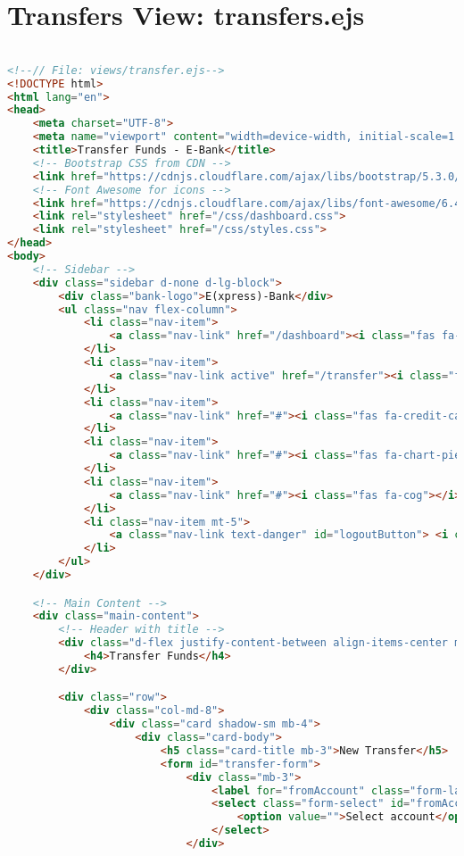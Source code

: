 \section{Transfers View: transfers.ejs}
\begin{lstlisting}[language=HTML]

<!--// File: views/transfer.ejs-->
<!DOCTYPE html>
<html lang="en">
<head>
    <meta charset="UTF-8">
    <meta name="viewport" content="width=device-width, initial-scale=1.0">
    <title>Transfer Funds - E-Bank</title>
    <!-- Bootstrap CSS from CDN -->
    <link href="https://cdnjs.cloudflare.com/ajax/libs/bootstrap/5.3.0/css/bootstrap.min.css" rel="stylesheet">
    <!-- Font Awesome for icons -->
    <link href="https://cdnjs.cloudflare.com/ajax/libs/font-awesome/6.4.0/css/all.min.css" rel="stylesheet">
    <link rel="stylesheet" href="/css/dashboard.css">
    <link rel="stylesheet" href="/css/styles.css">
</head>
<body>
    <!-- Sidebar -->
    <div class="sidebar d-none d-lg-block">
        <div class="bank-logo">E(xpress)-Bank</div>
        <ul class="nav flex-column">
            <li class="nav-item">
                <a class="nav-link" href="/dashboard"><i class="fas fa-home"></i> Dashboard</a>
            </li>
            <li class="nav-item">
                <a class="nav-link active" href="/transfer"><i class="fas fa-exchange-alt"></i> Transfers</a>
            </li>
            <li class="nav-item">
                <a class="nav-link" href="#"><i class="fas fa-credit-card"></i> Cards</a>
            </li>
            <li class="nav-item">
                <a class="nav-link" href="#"><i class="fas fa-chart-pie"></i> Investments</a>
            </li>
            <li class="nav-item">
                <a class="nav-link" href="#"><i class="fas fa-cog"></i> Settings</a>
            </li>
            <li class="nav-item mt-5">
                <a class="nav-link text-danger" id="logoutButton"> <i class="fas fa-sign-out-alt"></i> Logout</a>
            </li>
        </ul>
    </div>

    <!-- Main Content -->
    <div class="main-content">
        <!-- Header with title -->
        <div class="d-flex justify-content-between align-items-center mb-4">
            <h4>Transfer Funds</h4>
        </div>

        <div class="row">
            <div class="col-md-8">
                <div class="card shadow-sm mb-4">
                    <div class="card-body">
                        <h5 class="card-title mb-3">New Transfer</h5>
                        <form id="transfer-form">
                            <div class="mb-3">
                                <label for="fromAccount" class="form-label">From Account</label>
                                <select class="form-select" id="fromAccount" name="fromAccount" required>
                                    <option value="">Select account</option>
                                </select>
                            </div>


\end{lstlisting}
